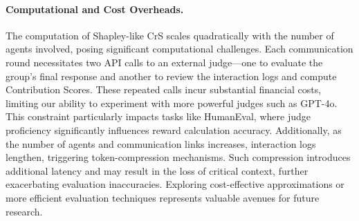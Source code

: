 \paragraph{Computational and Cost Overheads.}
The computation of Shapley-like CrS scales quadratically with the number of agents involved, posing significant computational challenges. Each communication round necessitates two API calls to an external judge—one to evaluate the group's final response and another to review the interaction logs and compute Contribution Scores. These repeated calls incur substantial financial costs, limiting our ability to experiment with more powerful judges such as GPT-4o. This constraint particularly impacts tasks like HumanEval, where judge proficiency significantly influences reward calculation accuracy. Additionally, as the number of agents and communication links increases, interaction logs lengthen, triggering token-compression mechanisms. Such compression introduces additional latency and may result in the loss of critical context, further exacerbating evaluation inaccuracies. Exploring cost-effective approximations or more efficient evaluation techniques represents valuable avenues for future research.